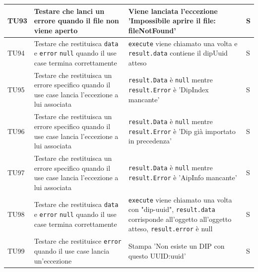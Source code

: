 \documentclass[a4paper,12pt]{article}
\begin{document}
\begin{longtable}{|M{1.2cm}|M{5cm}|M{8cm}|M{1.5cm}|}
            TU93 & Testare che \texttt{} lanci un errore quando il file non viene aperto & Viene lanciata l'eccezione 'Impossibile aprire il file: fileNotFound' & S \\
            \hline


            TU94 & Testare che \texttt{} restituisca \texttt{data} e \texttt{error} \texttt{null} quando il use case termina correttamente & \texttt{execute} viene chiamato una volta e \texttt{result.data} contiene il dipUuid atteso & S \\
            \hline

            TU95 & Testare che \texttt{} restituisca un errore specifico quando il use case lancia l'eccezione a lui associata & \texttt{result.Data} è \texttt{null} mentre \texttt{result.Error} è 'DipIndex mancante' & S \\
            \hline

            TU96 & Testare che \texttt{} restituisca un errore specifico quando il use case lancia l'eccezione a lui associata & \texttt{result.Data} è \texttt{null} mentre \texttt{result.Error} è 'Dip già importato in precedenza' & S \\
            \hline

            TU97 & Testare che \texttt{} restituisca un errore specifico quando il use case lancia l'eccezione a lui associata & \texttt{result.Data} è \texttt{null} mentre \texttt{result.Error} è 'AipInfo mancante' & S \\
            \hline

            TU98 & Testare che \texttt{} restituisca \texttt{data} e \texttt{error} \texttt{null} quando il use case termina correttamente & \texttt{execute} viene chiamato una volta con "dip-uuid", \texttt{result.data} corrisponde all'oggetto all'oggetto atteso, \texttt{result.error} è null & S \\
            \hline

            TU99 & Testare che \texttt{} restituisce \texttt{error} quando il use case lancia un'eccezione & Stampa 'Non esiste un DIP con questo UUID:uuid' & S \\
            \hline


\end{longtable}
\end{document}
